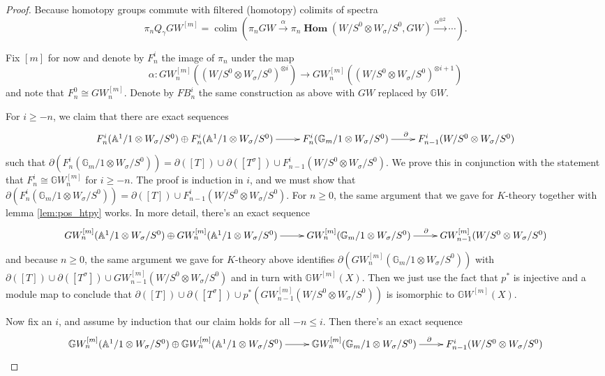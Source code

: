 \documentclass[draftthesis,tocnosub,noragright,centerchapter,10pt]{uiucthesis2009}
\newcommand{\mbb}{\mathbb}
\DeclareMathOperator*{\colim}{colim}
\DeclareMathOperator{\iHom}{\mathbf{Hom}}
\theoremstyle{plain}
\theoremstyle{definition}
\begin{document}
\begin{proof}
Because homotopy groups
commute with filtered (homotopy) colimits of spectra
\[
\pi_nQ_\gamma GW^{[m]} = \colim(\pi_n GW \xrightarrow{\alpha} \pi_n\iHom(W/S^0
\otimes W_\sigma/S^0,GW) \xrightarrow{\alpha^{\otimes  2}} \cdots).
\]

Fix $[m]$ for now and denote by $F^i_n$ the image of $\pi_n$ under
the map
\[
\alpha : GW_n^{[m]}((W/S^0 \otimes W_\sigma/S^0)^{\otimes i})
\rightarrow GW_n^{[m]}((W/S^0 \otimes W_\sigma/S^0)^{\otimes i+1})
\]
and note that $F^0_n \cong GW^{[m]}_n$. Denote by $FB^i_n$ the same
construction as above with $GW$ replaced by $\mbb GW$.

For $i \geq -n$, we claim that there are exact sequences
\[
\xymatrix{F^i_n(\mbb A^1/1 \otimes W_\sigma/S^0)  \oplus F^i_n(\mbb
  A^1/1 \otimes W_\sigma/S^0)  \ar[r] & F^i_n(\mbb G_m/1 \otimes W_\sigma/S^0) \ar[r]^{\partial} &
  F^{i}_{n-1}(W/S^0 \otimes W_\sigma/S^0) }
\]
such that $\partial(F^i_n(\mbb
G_m/1 \otimes W_\sigma/S^0)) = \partial([T]) \cup \partial([T^\sigma])
\cup  F^{i}_{n-1}(W/S^0 \otimes W_\sigma/S^0)$. We prove this in conjunction with the
statement that  $F^i_n \cong \mbb
GW^{[m]}_n$ for $i \geq -n$. The proof is induction in $i$, and we
must show that $\partial(F^i_n(\mbb
G_m/1 \otimes W_\sigma/S^0)) = \partial([T]) \cup  F^{i}_{n-1}(W/S^0
\otimes W_\sigma/S^0)$. For $n \geq 0$, the same argument that we
gave for $K$-theory together with lemma \ref{lem:pos_htpy} works. In
more detail, there's an exact sequence
\[
\xymatrix{GW^{[m]}_n(\mbb A^1/1 \otimes W_\sigma/S^0)  \oplus GW^{[m]}_n(\mbb
  A^1/1 \otimes W_\sigma/S^0)  \ar[r] & GW^{[m]}_n(\mbb G_m/1 \otimes W_\sigma/S^0) \ar[r]^{\partial} &
  GW^{[m]}_{n-1}(W/S^0 \otimes W_\sigma/S^0)  }
\]
and because $n \geq 0$, the same argument we gave for $K$-theory above
identifies $\partial( GW^{[m]}_n(\mbb G_m/1 \otimes W_\sigma/S^0))$
with $\partial([T]) \cup \partial([T^\sigma]) \cup
GW^{[m]}_{n-1}(W/S^0\otimes W_\sigma/S^0)$ and in turn
with $\mbb GW^{[m]}(X)$. Then we just use the fact that $p^*$ is
injective and a module map to conclude that $\partial([T]) \cup \partial([T^\sigma]) \cup
p^*(GW^{[m]}_{n-1}(W/S^0\otimes W_\sigma/S^0))$ is isomorphic to $\mbb GW^{[m]}(X)$.

Now fix an $i$, and assume by induction that our claim holds for all
$-n \leq i$. Then there's an exact sequence 
\[
\xymatrix{\mbb GW^{[m]}_n(\mbb A^1/1 \otimes W_\sigma/S^0)  \oplus
  \mbb GW^{[m]}_n(\mbb
  A^1/1 \otimes W_\sigma/S^0)  \ar[r] & \mbb GW^{[m]}_n(\mbb G_m/1
  \otimes W_\sigma/S^0) \ar[r]^{\partial} & F^{i}_{n-1}(W/S^0 \otimes W_\sigma/S^0)
}
\]


\end{proof}
\end{document}

